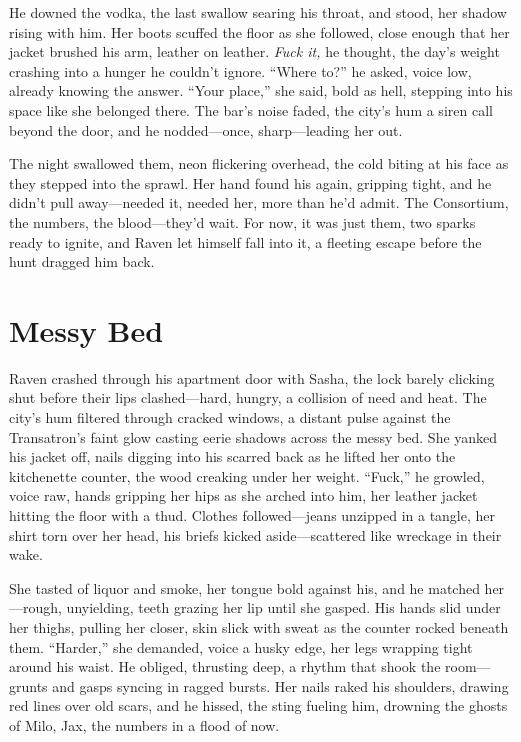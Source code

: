 \documentclass[12pt]{book}
\begin{document}
He downed the vodka, the last swallow searing his throat, and stood, her shadow rising with him. Her boots scuffed the floor as she followed, close enough that her jacket brushed his arm, leather on leather. \textit{Fuck it,} he thought, the day’s weight crashing into a hunger he couldn’t ignore. “Where to?” he asked, voice low, already knowing the answer. “Your place,” she said, bold as hell, stepping into his space like she belonged there. The bar’s noise faded, the city’s hum a siren call beyond the door, and he nodded—once, sharp—leading her out.

The night swallowed them, neon flickering overhead, the cold biting at his face as they stepped into the sprawl. Her hand found his again, gripping tight, and he didn’t pull away—needed it, needed her, more than he’d admit. The Consortium, the numbers, the blood—they’d wait. For now, it was just them, two sparks ready to ignite, and Raven let himself fall into it, a fleeting escape before the hunt dragged him back.

\section{Messy Bed}

Raven crashed through his apartment door with Sasha, the lock barely clicking shut before their lips clashed—hard, hungry, a collision of need and heat. The city’s hum filtered through cracked windows, a distant pulse against the Transatron’s faint glow casting eerie shadows across the messy bed. She yanked his jacket off, nails digging into his scarred back as he lifted her onto the kitchenette counter, the wood creaking under her weight. “Fuck,” he growled, voice raw, hands gripping her hips as she arched into him, her leather jacket hitting the floor with a thud. Clothes followed—jeans unzipped in a tangle, her shirt torn over her head, his briefs kicked aside—scattered like wreckage in their wake.

She tasted of liquor and smoke, her tongue bold against his, and he matched her—rough, unyielding, teeth grazing her lip until she gasped. His hands slid under her thighs, pulling her closer, skin slick with sweat as the counter rocked beneath them. “Harder,” she demanded, voice a husky edge, her legs wrapping tight around his waist. He obliged, thrusting deep, a rhythm that shook the room—grunts and gasps syncing in ragged bursts. Her nails raked his shoulders, drawing red lines over old scars, and he hissed, the sting fueling him, drowning the ghosts of Milo, Jax, the numbers in a flood of now.
\end{document}
